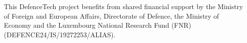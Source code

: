 \documentclass[sigconf]{aamas}
\begin{document}


\begin{acks}
    This DefenceTech project benefits from shared financial support by the Ministry of Foreign and European Affairs, Directorate of Defence, the Ministry of Economy and the Luxembourg National Research Fund (FNR) (DEFENCE24/IS/19272253/ALIAS).
\end{acks}



\nocite{soule2024moise_marl}




\end{document}
